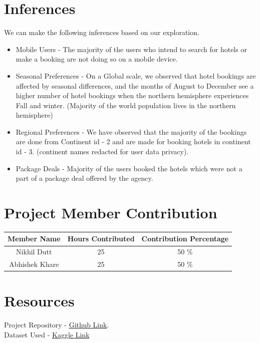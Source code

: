 \documentclass[conference]{IEEEtran}
\begin{document}
\section{\textbf{Inferences}}
We can make the following inferences based on our exploration.
\begin{itemize}
  \item Mobile Users - The majority of the users who intend to search for hotels or make a booking are not doing so on a mobile device.
  \item Seasonal Preferences - On a Global scale, we observed that hotel bookings are affected by seasonal differences, and the months of August to December see a higher number of hotel bookings when the northern hemisphere experiences Fall and winter. (Majority of the world population lives in the northern hemisphere)
  \item Regional Preferences - We have observed that the majority of the bookings are done from Continent id - 2 and are made for booking hotels in continent id - 3. (continent names redacted for user data privacy).
  \item Package Deals - Majority of the users booked the hotels which were not a part of a package deal offered by the agency.
\end{itemize}

\section{\textbf{Project Member Contribution}}
\begin{table}[htbp]
\begin{tabular}{|c|c|c|}
\hline
Member Name    & Hours Contributed & Contribution Percentage \\ \hline
Nikhil Dutt    & 25                & 50 \%                   \\ \hline
Abhishek Khare & 25                & 50 \%                   \\ \hline
\end{tabular}
\end{table}

\section{\textbf{Resources}}
\noindent Project Repository - \href{https://github.com/abhishekkhare1998/Hotel-Booking-Recommendation}{Github Link}.\\
 Dataset Used - \href{https://www.kaggle.com/competitions/expedia-hotel-recommendations/data}{Kaggle Link}


\end{document}
